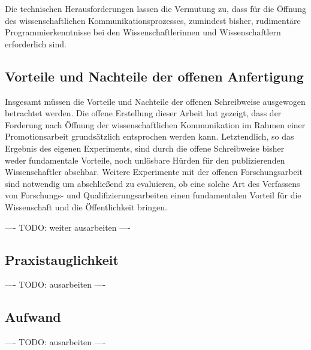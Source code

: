Die technischen Herausforderungen lassen die Vermutung zu, dass für die Öffnung des wissenschaftlichen Kommunikationsprozesses, zumindest bisher, rudimentäre Programmierkenntnisse bei den Wissenschaftlerinnen und Wissenschaftlern erforderlich sind.

\subsection{Vorteile und Nachteile der offenen Anfertigung}

Insgesamt müssen die Vorteile und Nachteile der offenen Schreibweise ausgewogen betrachtet werden. Die offene Erstellung dieser Arbeit hat gezeigt, dass der Forderung nach Öffnung der wissenschaftlichen Kommunikation im Rahmen einer Promotionsarbeit grundsätzlich entsprochen werden kann. Letztendlich, so das Ergebnis des eigenen Experiments, sind durch die offene Schreibweise bisher weder fundamentale Vorteile, noch unlösbare Hürden für den publizierenden Wissenschaftler absehbar. Weitere Experimente mit der offenen Forschungsarbeit sind notwendig um abschließend zu evaluieren, ob eine solche Art des Verfassens von Forschungs- und Qualifizierungsarbeiten einen fundamentalen Vorteil für die Wissenschaft und die Öffentlichkeit bringen.

---- TODO: weiter ausarbeiten ----

\subsection{Praxistauglichkeit}

---- TODO: ausarbeiten ----

\subsection{Aufwand}

---- TODO: ausarbeiten ----
